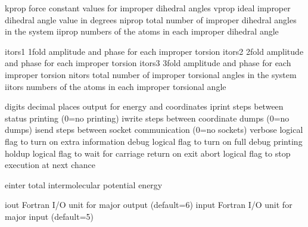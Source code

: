 \documentclass[letterpaper,11pt,english]{sphinxmanual}
\begin{document}
\begin{sphinxVerbatim}[commandchars=\\\{\}]
kprop           force constant values for improper dihedral angles
vprop           ideal improper dihedral angle value in degrees
niprop          total number of improper dihedral angles in the system
iiprop          numbers of the atoms in each improper dihedral angle
\end{sphinxVerbatim}


\begin{sphinxVerbatim}[commandchars=\\\{\}]
itors1          1\PYGZhy{}fold amplitude and phase for each improper torsion
itors2          2\PYGZhy{}fold amplitude and phase for each improper torsion
itors3          3\PYGZhy{}fold amplitude and phase for each improper torsion
nitors          total number of improper torsional angles in the system
iitors          numbers of the atoms in each improper torsional angle
\end{sphinxVerbatim}


\begin{sphinxVerbatim}[commandchars=\\\{\}]
digits          decimal places output for energy and coordinates
iprint          steps between status printing (0=no printing)
iwrite          steps between coordinate dumps (0=no dumps)
isend           steps between socket communication (0=no sockets)
verbose         logical flag to turn on extra information
debug           logical flag to turn on full debug printing
holdup          logical flag to wait for carriage return on exit
abort           logical flag to stop execution at next chance
\end{sphinxVerbatim}


\begin{sphinxVerbatim}[commandchars=\\\{\}]
einter          total intermolecular potential energy
\end{sphinxVerbatim}


\begin{sphinxVerbatim}[commandchars=\\\{\}]
iout            Fortran I/O unit for major output (default=6)
input           Fortran I/O unit for major input (default=5)
\end{sphinxVerbatim}
\end{document}
